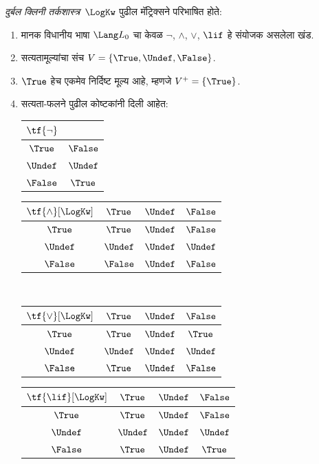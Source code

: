 \documentclass[../../../include/open-logic-section]{subfiles}
\begin{document}
\begin{defn}
\emph{दुर्बल क्लिनी तर्कशास्त्र}~$\LogKw$ पुढील मॅट्रिक्सने
परिभाषित होते:
\begin{enumerate}
  \item मानक विधानीय भाषा $\Lang L_0$ चा केवळ
  $\lnot$, $\land$, $\lor$, $\lif$ हे संयोजक असलेला खंड.
  \item सत्यतामूल्यांचा संच $V = \{\True, \Undef, \False\}$.
  \item $\True$ हेच एकमेव निर्दिष्ट मूल्य आहे, म्हणजे $V^+ = \{\True\}$.
  \item सत्यता-फलने पुढील कोष्टकांनी दिली आहेत:
  \begin{center}
    \begin{tabular}{c|c}
      $\tf{\lnot}$ & \\
      \hline
      $\True$ & $\False$ \\
      $\Undef$ & $\Undef$ \\
      $\False$ & $\True$
    \end{tabular}
    \quad
    \begin{tabular}{c|ccc}
      $\tf{\land}[\LogKw]$ & $\True$ & $\Undef$ & $\False$ \\
      \hline
      $\True$ & $\True$ & $\Undef$ & $\False$ \\
      $\Undef$ & $\Undef$ & $\Undef$ & $\Undef$\\
      $\False$ & $\False$ & $\Undef$ & $\False$
    \end{tabular}
    \\[2ex]
    \begin{tabular}{c|ccc}
      $\tf{\lor}[\LogKw]$ & $\True$ & $\Undef$ & $\False$ \\
      \hline
      $\True$ & $\True$ & $\Undef$ & $\True$ \\
      $\Undef$ & $\Undef$ & $\Undef$ & $\Undef$ \\
      $\False$ & $\True$ & $\Undef$ & $\False$
    \end{tabular}
    \quad
    \begin{tabular}{c|ccc}
      $\tf{\lif}[\LogKw]$ & $\True$ & $\Undef$ & $\False$ \\
      \hline
      $\True$ & $\True$ & $\Undef$ & $\False$ \\
      $\Undef$ & $\Undef$ & $\Undef$ & $\Undef$  \\
      $\False$ & $\True$ & $\Undef$ & $\True$
    \end{tabular}
  \end{center}
\end{enumerate}
\end{defn}
\end{document}
